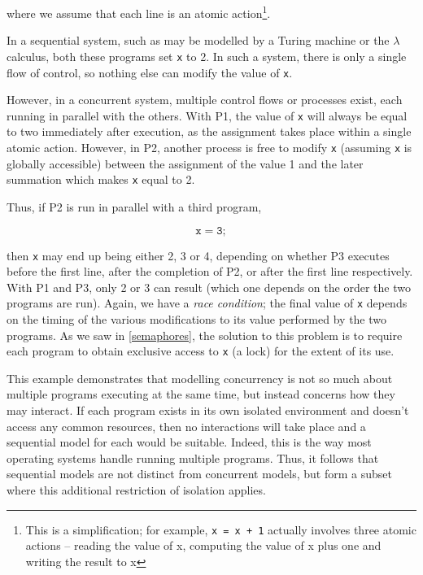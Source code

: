 \noindent where we assume that each line is an atomic
action\footnote{This is a simplification; for example, \texttt{x = x +
    1} actually involves three atomic actions -- reading the value of
  x, computing the value of x plus one and writing the result to x}.

In a sequential system, such as may be modelled by a Turing machine or the
$\lambda$ calculus, both these programs set \texttt{x} to 2.  In such a
system, there is only a single flow of control, so nothing else can
modify the value of \texttt{x}.

However, in a concurrent system, multiple control flows or processes
exist, each running in parallel with the others.  With P1, the value
of \texttt{x} will always be equal to two immediately after execution,
as the assignment takes place within a single atomic action.  However,
in P2, another process is free to modify \texttt{x} (assuming
\texttt{x} is globally accessible) between the assignment of the value
1 and the later summation which makes \texttt{x} equal to 2.

Thus, if P2 is run in parallel with a third program,

\begin{equation}
\mathtt{x = 3;} \tag{P3}
\end{equation}

\noindent then \texttt{x} may end up being either 2, 3 or 4, depending
on whether P3 executes before the first line, after the completion of
P2, or after the first line respectively.  With P1 and P3, only 2 or 3
can result (which one depends on the order the two programs are run).
Again, we have a \emph{race condition}; the final value of \texttt{x}
depends on the timing of the various modifications to its value
performed by the two programs.  As we saw in \ref{semaphores}, the
solution to this problem is to require each program to obtain
exclusive access to \texttt{x} (a lock) for the extent of its use.

This example demonstrates that modelling concurrency is not so much
about multiple programs executing at the same time, but instead
concerns how they may interact.  If each program exists in its own
isolated environment and doesn't access any common resources, then no
interactions will take place and a sequential model for each would be
suitable.  Indeed, this is the way most operating systems handle
running multiple programs.  Thus, it follows that sequential models
are not distinct from concurrent models, but form a subset where this
additional restriction of isolation applies.

